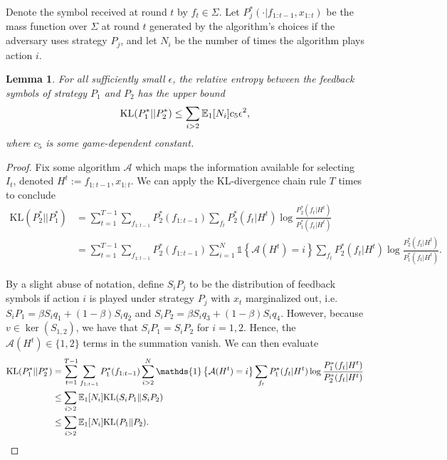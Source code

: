 \documentclass{article}
\newcommand{\KL}{\mathrm{KL}}
\newtheorem{lemma}{Lemma}
\begin{document}
Denote the symbol received at round $t$ by $f_t\in\Sigma$. Let $P_j^*(\cdot| f_{1:t-1},x_{1:t})$ be the mass function over $\Sigma$ at round $t$ generated by the algorithm's choices if the adversary uses strategy $P_j$, and let $N_i$ be the number of times the algorithm plays action $i$.
\begin{lemma}\label{lemma:feedback.kl}
  For all sufficiently small $\epsilon$, the relative entropy between the feedback symbols of strategy $P_1$ and $P_2$ has the upper bound
  \begin{equation}
    \KL(P_1^*||P_2^*)
  \leq
      \sum_{i>2} \ex_1[N_i] c_5\epsilon^2,
\end{equation}
where $c_5$ is some game-dependent constant. 
\end{lemma}
\begin{proof}
  Fix some algorithm $\mathcal A$ which maps the information available for selecting $I_t$, denoted $H^t := f_{1:t-1},x_{1:t}$.  We can apply the KL-divergence chain rule $T$ times to conclude
  \begin{align*}
   \KL(P_2^*||P_1^*)
    &=
      \sum_{t=1}^{T-1}\sum_{f_{1:t-1}}P_2^*(f_{1:t-1}) \sum_{f_t} P_2^*(f_t|H^t)
      \log \frac{ P_2^*(f_t|H^t)}{ P_1^*(f_t|H^t)}\\
    &=
      \sum_{t=1}^{T-1}\sum_{f_{1:t-1}}P_2^*(f_{1:t-1})
      \sum_{i=1}^N\mathds{1}\left\{ \mathcal A(H^t) = i \right\}
      \sum_{f_t} P_2^*(f_t|H^t)
      \log \frac{ P_2^*(f_t|H^t)}{ P_1^*(f_t|H^t)}.
  \end{align*}

By a slight abuse of notation, define $S_i P_j$ to be the distribution of feedback symbols if action $i$ is played under strategy $P_j$ with $x_t$ marginalized out, i.e. $S_i P_1 = \beta S_i q_1 + (1-\beta) S_i q_2$ and $S_i P_2 = \beta S_i q_3 + (1-\beta) S_i q_4$. However, because $v\in\ker(S_{1,2})$, we have that $S_i P_1 = S_i P_2$ for $i=1,2$. Hence, the $\mathcal A(H^t) \in\{ 1, 2\}$ terms in the summation vanish. We can then evaluate
\begin{align*}
    \KL(P_1^*||P_2^*)
    &=
      \sum_{t=1}^{T-1}\sum_{f_{1:t-1}}P_1^*(f_{1:t-1})
      \sum_{i>2}^N\mathds{1}\left\{ \mathcal A(H^t) = i \right\}
      \sum_{f_t} P_1^*(f_t|H^t)
      \log \frac{ P_1^*(f_t|H^t)}{ P_2^*(f_t|H^t)}\\
    &\leq
      \sum_{i>2} \ex_1[N_i] \KL( S_i P_1\Vert S_i P_2)\\
    &\leq
      \sum_{i>2} \ex_1[N_i] \KL( P_1\Vert P_2).
\end{align*}


\end{proof}
\end{document}
